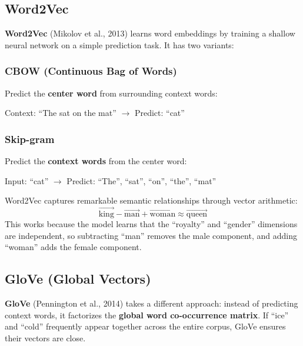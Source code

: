 \documentclass[11pt,a4paper]{article}
\begin{document}
\subsection{Word2Vec}

\textbf{Word2Vec} (Mikolov et al., 2013) learns word embeddings by training a shallow neural network on a simple prediction task. It has two variants:

\subsubsection*{CBOW (Continuous Bag of Words)}

Predict the \textbf{center word} from surrounding context words:

\begin{center}
Context: ``The \underline{\hspace{1cm}} sat on the mat'' $\to$ Predict: ``cat''
\end{center}

\subsubsection*{Skip-gram}

Predict the \textbf{context words} from the center word:

\begin{center}
Input: ``cat'' $\to$ Predict: ``The'', ``sat'', ``on'', ``the'', ``mat''
\end{center}

\begin{tcolorbox}[intuitionbox={The Famous Analogy}]
Word2Vec captures remarkable semantic relationships through vector arithmetic:
\[
\vec{\text{king}} - \vec{\text{man}} + \vec{\text{woman}} \approx \vec{\text{queen}}
\]
This works because the model learns that the ``royalty'' and ``gender'' dimensions are independent, so subtracting ``man'' removes the male component, and adding ``woman'' adds the female component.
\end{tcolorbox}

\subsection{GloVe (Global Vectors)}

\textbf{GloVe} (Pennington et al., 2014) takes a different approach: instead of predicting context words, it factorizes the \textbf{global word co-occurrence matrix}. If ``ice'' and ``cold'' frequently appear together across the entire corpus, GloVe ensures their vectors are close.
\end{document}
